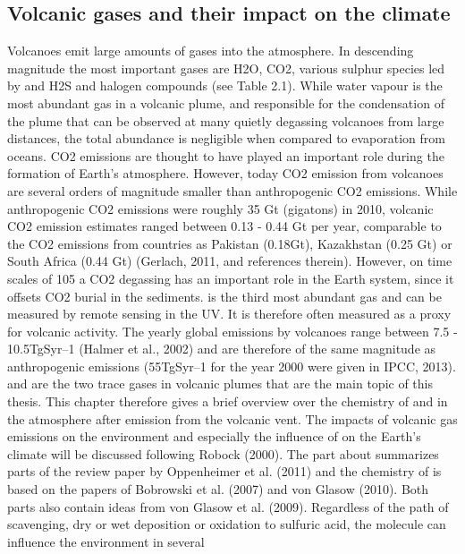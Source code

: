 \documentclass  [
  paper    = a4,
  BCOR     = 10mm,
  twoside,
  fontsize = 12pt,
  fleqn,
  toc      = bibnumbered,
  toc      = listofnumbered,
  numbers  = noendperiod,
  headings = normal,
  listof   = leveldown,
  version  = 3.03
]                                       {scrreprt}
\begin{document}
	\subsection{Volcanic gases and their impact on the climate}
	Volcanoes emit large amounts of gases into the atmosphere. In descending
	magnitude the most important gases are H2O, CO2, various sulphur species led
	by  and H2S and halogen compounds (see Table 2.1). While water vapour is
	the most abundant gas in a volcanic plume, and responsible for the condensation
	of the plume that can be observed at many quietly degassing volcanoes from
	large distances, the total abundance is negligible when compared to evaporation
	from oceans. CO2 emissions are thought to have played an important role
	during the formation of Earth’s atmosphere. However, today CO2 emission
	from volcanoes are several orders of magnitude smaller than anthropogenic CO2
	emissions. While anthropogenic CO2 emissions were roughly 35 Gt (gigatons)
	in 2010, volcanic CO2 emission estimates ranged between 0.13 - 0.44 Gt per
	year, comparable to the CO2 emissions from countries as Pakistan (0.18Gt),
	Kazakhstan (0.25 Gt) or South Africa (0.44 Gt) (Gerlach, 2011, and references
	therein). However, on time scales of 105 a CO2 degassing has an important role
	in the Earth system, since it offsets CO2 burial in the sediments.  is the
	third most abundant gas and can be measured by remote sensing in the UV. It
	is therefore often measured as a proxy for volcanic activity. The yearly global
	 emissions by volcanoes range between 7.5 - 10.5TgSyr–1 (Halmer et al.,
	2002) and are therefore of the same magnitude as anthropogenic  emissions
	(55TgSyr–1 for the year 2000 were given in IPCC, 2013).
	 and  are the two trace gases in volcanic plumes that are the main topic
	of this thesis. This chapter therefore gives a brief overview over the chemistry
	of  and  in the atmosphere after emission from the volcanic vent. The
	impacts of volcanic gas emissions on the environment and especially the influence
	of  on the Earth’s climate will be discussed following Robock (2000). The
	part about  summarizes parts of the review paper by Oppenheimer et al.
	(2011) and the chemistry of  is based on the papers of Bobrowski et al. (2007)
	and von Glasow (2010). Both parts also contain ideas from von Glasow et al.
	(2009).
	Regardless of the path of  scavenging,
	dry or wet deposition or oxidation
	to sulfuric acid, the molecule
	can influence the environment in several
\end{document}
